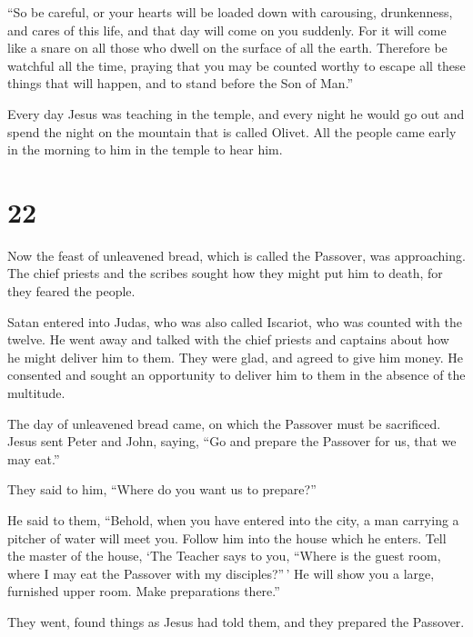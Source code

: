  ``So be careful, or your hearts will be loaded down with
carousing, drunkenness, and cares of this life, and that day will come
on you suddenly.  For it will come like a snare on all
those who dwell on the surface of all the earth.  Therefore
be watchful all the time, praying that you may be counted worthy to
escape all these things that will happen, and to stand before the Son of
Man.''

 Every day Jesus was teaching in the temple, and every
night he would go out and spend the night on the mountain that is called
Olivet.  All the people came early in the morning to him in
the temple to hear him.

\hypertarget{section-12}{%
\section{22}\label{section-12}}

 Now the feast of unleavened bread, which is called the
Passover, was approaching.  The chief priests and the
scribes sought how they might put him to death, for they feared the
people.

 Satan entered into Judas, who was also called Iscariot, who
was counted with the twelve.  He went away and talked with
the chief priests and captains about how he might deliver him to them.
 They were glad, and agreed to give him money. 
He consented and sought an opportunity to deliver him to them in the
absence of the multitude.

 The day of unleavened bread came, on which the Passover
must be sacrificed.  Jesus sent Peter and John, saying, ``Go
and prepare the Passover for us, that we may eat.''

 They said to him, ``Where do you want us to prepare?''

 He said to them, ``Behold, when you have entered into the
city, a man carrying a pitcher of water will meet you. Follow him into
the house which he enters.  Tell the master of the house,
`The Teacher says to you, ``Where is the guest room, where I may eat the
Passover with my disciples?''\,'  He will show you a large,
furnished upper room. Make preparations there.''

 They went, found things as Jesus had told them, and they
prepared the Passover.

